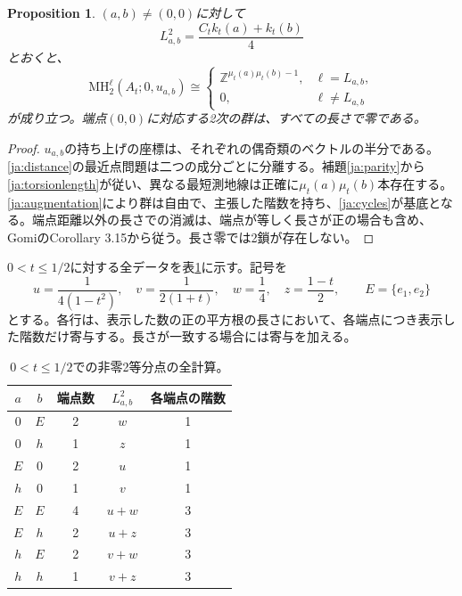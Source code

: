 \documentclass[12pt]{amsart}
\newcommand{\PropositionName}{Proposition}
\newtheorem{prop}[thm]{\PropositionName}
\theoremstyle{definition}
\theoremstyle{remark}
\numberwithin{equation}{section}
\newcommand{\Z}{\mathbb{Z}}
\newcommand{\MH}{\mathrm{MH}}
\begin{document}
\begin{prop}\label{ja:profile}
$(a,b)\ne(0,0)$に対して
\begin{equation}\label{ja:torsionlength}
L_{a,b}^2=\frac{C_t k_t(a)+k_t(b)}4
\end{equation}
とおくと、
\begin{equation}\label{ja:torsionrank}
\MH_2^\ell(A_t;0,u_{a,b})\cong
\begin{cases}
\Z^{\mu_t(a)\mu_t(b)-1},&\ell=L_{a,b},\\
0,&\ell\ne L_{a,b}
\end{cases}
\end{equation}
が成り立つ。端点$(0,0)$に対応する2次の群は、すべての長さで零である。
\end{prop}
\begin{proof}
$u_{a,b}$の持ち上げの座標は、それぞれの偶奇類のベクトルの半分である。\eqref{ja:distance}の最近点問題は二つの成分ごとに分離する。補題\ref{ja:parity}から\eqref{ja:torsionlength}が従い、異なる最短測地線は正確に$\mu_t(a)\mu_t(b)$本存在する。\eqref{ja:augmentation}により群は自由で、主張した階数を持ち、\eqref{ja:cycles}が基底となる。端点距離以外の長さでの消滅は、端点が等しく長さが正の場合も含め、GomiのCorollary 3.15から従う。長さ零では2鎖が存在しない。
\end{proof}

$0<t\leq1/2$に対する全データを表\ref{ja:table}に示す。記号を
\[
u=\frac1{4(1-t^2)},\quad v=\frac1{2(1+t)},\quad
w=\frac14,\quad z=\frac{1-t}{2},\qquad E=\{e_1,e_2\}
\]
とする。各行は、表示した数の正の平方根の長さにおいて、各端点につき表示した階数だけ寄与する。長さが一致する場合には寄与を加える。

\begin{table}[ht]
\centering
\caption{$0<t\leq1/2$での非零2等分点の全計算。}\label{ja:table}
\begin{tabular}{ccccc}
\hline
$a$&$b$&端点数&$L_{a,b}^2$&各端点の階数\\\hline
$0$&$E$&2&$w$&1\\
$0$&$h$&1&$z$&1\\
$E$&$0$&2&$u$&1\\
$h$&$0$&1&$v$&1\\
$E$&$E$&4&$u+w$&3\\
$E$&$h$&2&$u+z$&3\\
$h$&$E$&2&$v+w$&3\\
$h$&$h$&1&$v+z$&3\\\hline
\end{tabular}
\end{table}
\end{document}

